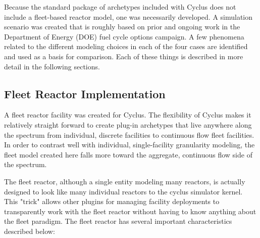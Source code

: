 \documentclass{style}
\begin{document}
Because the standard package of archetypes included with Cyclus does not
include a fleet-based reactor model, one was necessarily developed. A
simulation scenario was created that is roughly based on prior and ongoing
work in the Department of Energy (DOE) fuel cycle options campaign.  A few
phenomena related to the different modeling choices in each of the four cases
are identified and used as a basis for comparison.  Each of these things is
described in more detail in the following sections.

\subsection{Fleet Reactor Implementation}

A fleet reactor facility was created for Cyclus.  The flexibility of Cyclus
makes it relatively straight forward to create plug-in archetypes that
live anywhere along the spectrum from individual, discrete facilities to
continuous flow fleet facilities.  In order to contrast well with individual,
single-facility granularity modeling, the fleet model created here falls more
toward the aggregate, continuous flow side of the spectrum.  

The fleet reactor, although a single entity modeling many reactors, is
actually designed to look like many individual reactors to the cyclus
simulator kernel. This "trick" allows other plugins for managing facility
deployments to transparently work with the fleet reactor without having to
know anything about the fleet paradigm.  The fleet reactor has several
important characteristics described below:
\end{document}
